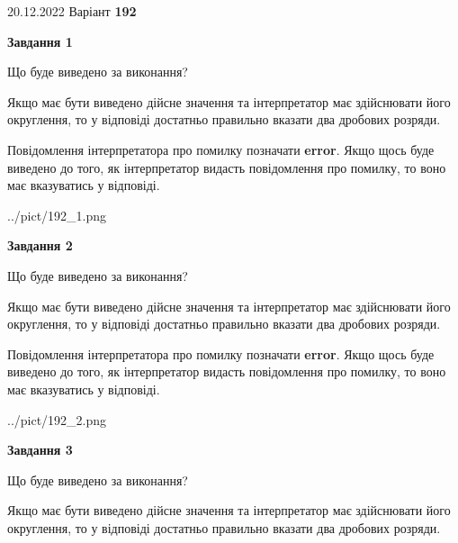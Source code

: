\documentclass[12pt, ukrainian]{article}
\begin{document}
{20.12.2022 Варіант \No \textbf { 192 }\par}
{
\begin {Large}

{\begin {center}\textbf{Завдання 1}\end {center}}\par
Що буде виведено за виконання? \par

Якщо має бути виведено дійсне значення та інтерпретатор має здійснювати його округлення, 
то у відповіді достатньо правильно вказати два дробових розряди.

Повідомлення інтерпретатора про помилку позначати \textbf{error}.
Якщо щось буде виведено до того, як інтерпретатор видасть повідомлення про помилку, 
то воно має вказуватись у відповіді. \par

\begin{center}
	{../pict/192_1.png}
\end{center}
\newpage

{\begin {center}\textbf{Завдання 2}\end {center}}\par
Що буде виведено за виконання? \par

Якщо має бути виведено дійсне значення та інтерпретатор має здійснювати його округлення, 
то у відповіді достатньо правильно вказати два дробових розряди.

Повідомлення інтерпретатора про помилку позначати \textbf{error}.
Якщо щось буде виведено до того, як інтерпретатор видасть повідомлення про помилку, 
то воно має вказуватись у відповіді. \par

\begin{center}
	{../pict/192_2.png}
\end{center}
\newpage

{\begin {center}\textbf{Завдання 3}\end {center}}\par
Що буде виведено за виконання? \par

Якщо має бути виведено дійсне значення та інтерпретатор має здійснювати його округлення, 
то у відповіді достатньо правильно вказати два дробових розряди.


\end{Large}}
\end{document}
